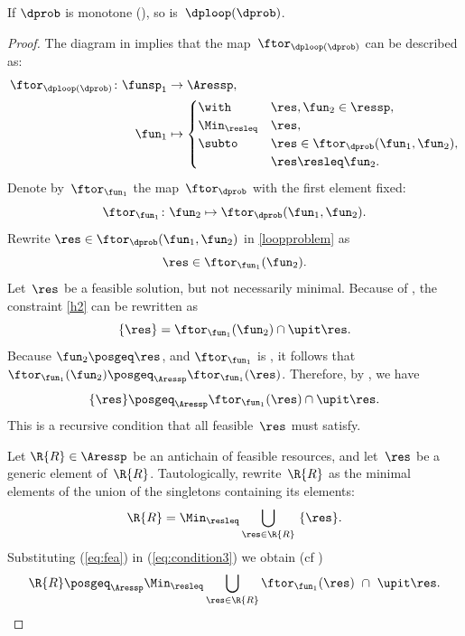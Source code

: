 \begin{prop}
\label{pro:loop-continuous}If $\dprob$ is monotone (),
so is~$\dploop(\dprob)$.
\end{prop}
\begin{proof}
The diagram in  implies that the map~$\ftor_{\dploop(\dprob)}$
can be described as:
\begin{align}
\ftor_{\dploop(\dprob)}\colon\funsp_{1} & \rightarrow\Aressp,\label{eq:loopproblem}\\
\fun_{1} & \mapsto\begin{cases}
\with & \res,\fun_{2}\in\ressp,\\
\Min_{\resleq} & \res,\\
\subto & \res\in\ftor_{\dprob}(\fun_{1},\fun_{2}),\\
 & \res\resleq\fun_{2}.
\end{cases}
\end{align}
Denote by~$\ftor_{\fun_{1}}$ the map~$\ftor_{\dprob}$ with the
first element fixed:
\[
\ftor_{\fun_{1}}\colon\fun_{2}\mapsto\ftor_{\dprob}(\fun_{1},\fun_{2}).
\]
Rewrite $\res\in\ftor_{\dprob}(\fun_{1},\fun_{2})$ in \eqref{loopproblem}
as
\begin{equation}
\res\in\ftor_{\fun_{1}}(\fun_{2}).\label{eq:h2}
\end{equation}
Let~$\res$ be a feasible solution, but not necessarily minimal.
Because of , the constraint \eqref{h2} can
be rewritten as 
\begin{equation}
\{\res\}=\ftor_{\fun_{1}}(\fun_{2})\cap\upit\res.\label{eq:h3}
\end{equation}
Because $\fun_{2}\posgeq\res$, and $\ftor_{\fun_{1}}$ is \scottcontinuous,
it follows that~$\ftor_{\fun_{1}}(\fun_{2})\posgeq_{\Aressp}\ftor_{\fun_{1}}(\res)$.
Therefore, by , we have
\begin{equation}
\{\res\}\posgeq_{\Aressp}\ftor_{\fun_{1}}(\res)\cap\upit\res.\label{eq:fea}
\end{equation}
This is a recursive condition that all feasible~$\res$ must satisfy.

Let $\R{R}\in\Aressp$ be an antichain of feasible resources, and
let~$\res$ be a generic element of~$\R{R}$. Tautologically, rewrite~$\R{R}$
as the minimal elements of the union of the singletons containing
its elements: 
\begin{equation}
\R{R}=\Min_{\resleq}\bigcup_{\res\in\R{R}}\ \{\res\}.\label{eq:condition3}
\end{equation}
Substituting (\ref{eq:fea}) in (\ref{eq:condition3}) we obtain (cf
)
\begin{equation}
\R{R}\posgeq_{\Aressp}\Min_{\resleq}\bigcup_{\res\in\R{R}}\ftor_{\fun_{1}}(\res)\ \cap\ \upit\res.\label{eq:recursive}
\end{equation}


\end{proof}
